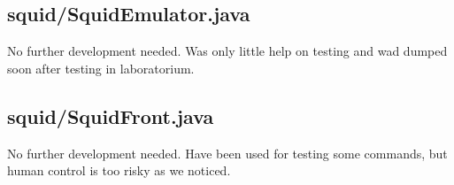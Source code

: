 \subsection{squid/SquidEmulator.java}

No further development needed. Was only little help on testing and wad dumped soon after testing in laboratorium.


\subsection{squid/SquidFront.java}

No further development needed. Have been used for testing some commands, but human control is too risky as we noticed.
